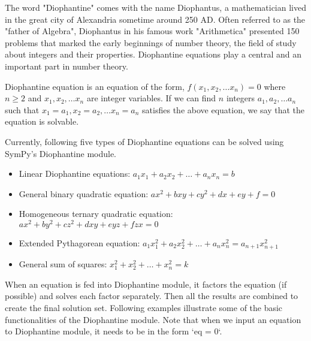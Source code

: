 The word "Diophantine" comes with the name Diophantus, a mathematician lived
in the great city of Alexandria sometime around 250 AD. Often referred to as
the "father of Algebra", Diophantus in his famous work "Arithmetica"
presented 150 problems that marked the early beginnings of number theory, the
field of study about integers and their properties. Diophantine equations play
a central and an important part in number theory.

Diophantine equation is an equation of the form, $f(x_1, x_2, \ldots x_n) = 0$
where $n \geq 2$ and $x_1, x_2, \ldots x_n$ are integer variables. If we can find
$n$ integers $a_1, a_2, \ldots a_n$ such that $x_1 = a_1, x_2 = a_2, \ldots x_n = a_n$
satisfies the above equation, we say that the equation is solvable.

Currently, following five types of Diophantine equations can be solved using
SymPy's Diophantine module.

\begin{itemize}
    \item Linear Diophantine equations: $a_1x_1 + a_2x_2 + \ldots + a_nx_n = b$
    \item General binary quadratic equation: $ax^2 + bxy + cy^2 + dx + ey + f = 0$
    \item Homogeneous ternary quadratic equation: $ax^2 + by^2 + cz^2 + dxy + eyz + fzx = 0$
    \item Extended Pythagorean equation: $a_{1}x_{1}^2 + a_{2}x_{2}^2 + \ldots + a_{n}x_{n}^2 = a_{n+1}x_{n+1}^2$
    \item General sum of squares: $x_{1}^2 + x_{2}^2 + \ldots + x_{n}^2 = k$
\end{itemize}

When an equation is fed into Diophantine module, it factors the equation (if
possible) and solves each factor separately. Then all the results are combined to
create the final solution set. Following examples illustrate some of the basic
functionalities of the Diophantine module. Note that when we input an equation to
Diophantine module, it needs to be in the form `eq = 0`.

